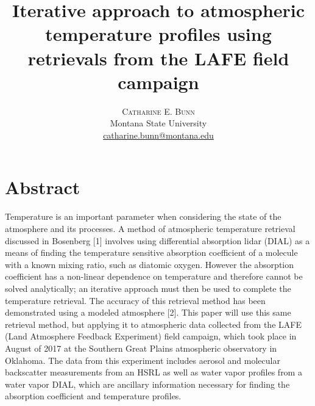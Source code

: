 \documentclass[twoside]{article}
\title{\vspace{-15mm}\fontsize{22pt}{10pt}\selectfont\textbf{Iterative approach to atmospheric temperature profiles using retrievals from the LAFE field campaign}} %
\author{
\large
\textsc{Catharine E. Bunn}\\[2mm] %
\normalsize Montana State University \\ %
\normalsize \href{mailto:catharine.bunn@montana.edu}{catharine.bunn@montana.edu} %
\vspace{-5mm}
}
\date{}
\begin{document}
\maketitle %

\thispagestyle{fancy} %



\section{Abstract}
Temperature is an important parameter when considering the state of the atmosphere and its processes. 
A method of atmospheric temperature retrieval discussed in Bosenberg [1] involves using differential absorption lidar (DIAL) as a means of finding the temperature sensitive absorption coefficient of a molecule with a known mixing ratio, such as diatomic oxygen. 
However the absorption coefficient has a non-linear dependence on temperature and therefore cannot be solved analytically; an iterative approach must then be used to complete the temperature retrieval.
 The accuracy of this retrieval method has been demonstrated using a modeled atmosphere [2]. 
 This paper will use this same retrieval method, but applying it to atmospheric data collected from the LAFE (Land Atmosphere Feedback Experiment) field campaign, which took place in August of 2017 at the Southern Great Plains atmospheric observatory in Oklahoma. 
 The data from this experiment includes aerosol and molecular backscatter measurements from an HSRL as well as water vapor profiles from a water vapor DIAL, which are ancillary information necessary for finding the absorption coefficient and temperature profiles.
\end{document}

